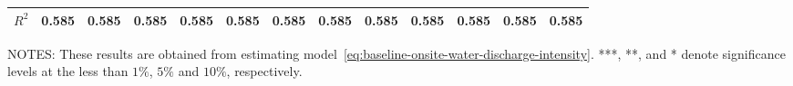 \begin{table}[H]
{\begin{tabular}{@{}lllllllllllll@{}}
            $R^2$                                         & 0.585     & 0.585     & 0.585     & 0.585     & 0.585     & 0.585     & 0.585                & 0.585                & 0.585                & 0.585             & 0.585             & 0.585             \\ \bottomrule \bottomrule
        \end{tabular}%
    }
    \begin{minipage}{\columnwidth}
        \vspace{0.05in}
        \tiny NOTES: These results are obtained from estimating model~\ref{eq:baseline-onsite-water-discharge-intensity}. ***, **, and * denote significance levels at the less than $1\%$, $5\%$ and $10\%$, respectively.
    \end{minipage}
\end{table}